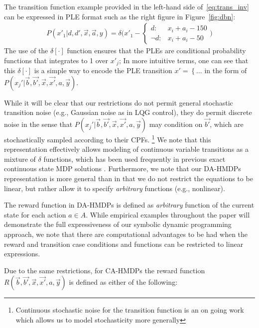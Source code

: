 \documentclass[twoside,11pt]{article}
\begin{document}
The transition function example provided in the left-hand side of~\eqref{eq:trans_inv} can be expressed in PLE format such as the right figure in Figure~\ref{fig:dbn}:
\begin{align*}
P(x'_1 | d, d',\vec{x},\vec{a}, y) = \delta \Bigg( x'_1 -  \begin{cases}
d  : & x_i + a_i - 150 \\
\neg d : & x_i + a_i - 50    
\end{cases} \Bigg) 
\end{align*}
The use of the $\delta[\cdot]$ function ensures that the PLEs are conditional
probability functions that integrates to 1 over $x'_j$; In more intuitive
terms, one can see that this $\delta[\cdot]$ is a simple way to encode
the PLE transition $x' = \left\{ \ldots \right.$ in the form of 
$P(x_j'|\vec{b},\vec{b'},\vec{x},\vec{x'},a,\vec{y})$.

While it will be clear that our restrictions do not permit general stochastic transition noise (e.g., Gaussian noise as in LQG control), they do permit discrete noise in the sense that
$P(x_j'|\vec{b},\vec{b'},\vec{x},\vec{x'},a,\vec{y})$ may condition on
$\vec{b'}$, which are stochastically sampled according to their CPFs.
\footnote{Continuous stochastic noise for the transition function is an on going work which allows us to model stochasticity more generally}
We note that this representation effectively allows modeling of
continuous variable transitions as a mixture of $\delta$ functions,
which has been used frequently in previous exact continuous state MDP
solutions \cite{feng04,hao09}.
Furthermore, we note that our
DA-HMDPs representation is more general than \cite{feng04,li05,hao09} in that
we do not restrict the equations to be linear, but rather
allow it to specify \emph{arbitrary} functions (e.g., nonlinear). 

The reward function in DA-HMDPs is defined as \emph{arbitrary} function of the current state for each action $a \in A$. 
While  empirical examples throughout the paper will demonstrate the full expressiveness of our symbolic dynamic programming approach, we note that there are computational advantages to be had when the reward and transition case conditions and functions can be restricted to linear expressions.  

Due to the same restrictions, for CA-HMDPs the reward function $R(\vec{b},\vec{b'},\vec{x},\vec{x'}, a,\vec{y})$ is defined as either of the following:
\end{document}
